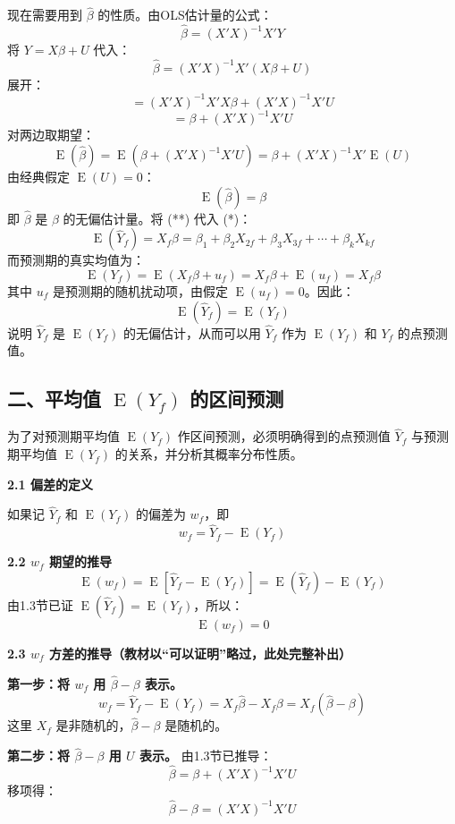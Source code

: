 \documentclass[12pt,a4paper]{ctexart}
\DeclareMathOperator{\E}{E}
\begin{document}
现在需要用到 $\hat{\beta}$ 的性质。由OLS估计量的公式：
\[
\hat{\beta} = (X'X)^{-1}X'Y
\]
将 $Y = X\beta + U$ 代入：
\[
\hat{\beta} = (X'X)^{-1}X'(X\beta + U)
\]
展开：
\[
= (X'X)^{-1}X'X\beta + (X'X)^{-1}X'U
\]
\[
= \beta + (X'X)^{-1}X'U
\]
对两边取期望：
\[
\E(\hat{\beta}) = \E(\beta + (X'X)^{-1}X'U) = \beta + (X'X)^{-1}X'\E(U)
\]
由经典假定 $\E(U)=0$：
\begin{equation}
\E(\hat{\beta}) = \beta \tag{**}
\end{equation}
即 $\hat{\beta}$ 是 $\beta$ 的无偏估计量。将 (**) 代入 (*)：
\begin{equation}
\E(\hat{Y}_f) = X_f \beta = \beta_1 + \beta_2 X_{2f} + \beta_3 X_{3f} + \cdots + \beta_k X_{kf} \tag{3.56}
\end{equation}
而预测期的真实均值为：
\[
\E(Y_f) = \E(X_f\beta + u_f) = X_f\beta + \E(u_f) = X_f\beta
\]
其中 $u_f$ 是预测期的随机扰动项，由假定 $\E(u_f)=0$。因此：
\[
\E(\hat{Y}_f) = \E(Y_f)
\]
说明 $\hat{Y}_f$ 是 $\E(Y_f)$ 的无偏估计，从而可以用 $\hat{Y}_f$ 作为 $\E(Y_f)$ 和 $Y_f$ 的点预测值。

\subsection{二、平均值 \texorpdfstring{$\E(Y_f)$}{E(Yf)} 的区间预测}

为了对预测期平均值 $\E(Y_f)$ 作区间预测，必须明确得到的点预测值 $\hat{Y}_f$ 与预测期平均值 $\E(Y_f)$ 的关系，并分析其概率分布性质。

\textbf{2.1 偏差的定义}

如果记 $\hat{Y}_f$ 和 $\E(Y_f)$ 的偏差为 $w_f$，即
\begin{equation}
w_f = \hat{Y}_f - \E(Y_f) \tag{3.57}
\end{equation}

\textbf{2.2 $w_f$ 期望的推导}
\[
\E(w_f) = \E[\hat{Y}_f - \E(Y_f)] = \E(\hat{Y}_f) - \E(Y_f)
\]
由1.3节已证 $\E(\hat{Y}_f) = \E(Y_f)$，所以：
\begin{equation}
\E(w_f) = 0 \tag{3.58}
\end{equation}

\textbf{2.3 $w_f$ 方差的推导（教材以“可以证明”略过，此处完整补出）}

\noindent\textbf{第一步：将 $w_f$ 用 $\hat{\beta}-\beta$ 表示。}
\[
w_f = \hat{Y}_f - \E(Y_f) = X_f\hat{\beta} - X_f\beta = X_f(\hat{\beta} - \beta)
\]
这里 $X_f$ 是非随机的，$\hat{\beta}-\beta$ 是随机的。

\noindent\textbf{第二步：将 $\hat{\beta}-\beta$ 用 $U$ 表示。}
由1.3节已推导：
\[
\hat{\beta} = \beta + (X'X)^{-1}X'U
\]
移项得：
\begin{equation}
\hat{\beta} - \beta = (X'X)^{-1}X'U \tag{***}
\end{equation}
\end{document}
